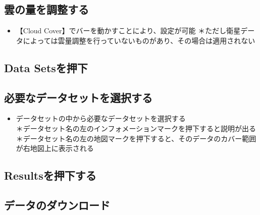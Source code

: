 \documentclass[
]{book}
\providecommand{\tightlist}{%
  \setlength{\itemsep}{0pt}\setlength{\parskip}{0pt}}
\begin{document}
\hypertarget{ux96f2ux306eux91cfux3092ux8abfux6574ux3059ux308b}{%
\subsection{雲の量を調整する}\label{ux96f2ux306eux91cfux3092ux8abfux6574ux3059ux308b}}

\begin{itemize}
\tightlist
\item
  【Cloud Cover】でバーを動かすことにより、設定が可能
  ＊ただし衛星データによっては雲量調整を行っていないものがあり、その場合は適用されない
\end{itemize}

\hypertarget{data-setsux3092ux62bcux4e0b}{%
\subsection{Data Setsを押下}\label{data-setsux3092ux62bcux4e0b}}

\hypertarget{ux5fc5ux8981ux306aux30c7ux30fcux30bfux30bbux30c3ux30c8ux3092ux9078ux629eux3059ux308b}{%
\subsection{必要なデータセットを選択する}\label{ux5fc5ux8981ux306aux30c7ux30fcux30bfux30bbux30c3ux30c8ux3092ux9078ux629eux3059ux308b}}

\begin{itemize}
\tightlist
\item
  データセットの中から必要なデータセットを選択する\\
  ＊データセット名の左のインフォメーションマークを押下すると説明が出る\\
  ＊データセット名の左の地図マークを押下すると、そのデータのカバー範囲が右地図上に表示される
\end{itemize}

\hypertarget{resultsux3092ux62bcux4e0bux3059ux308b}{%
\subsection{Resultsを押下する}\label{resultsux3092ux62bcux4e0bux3059ux308b}}

\hypertarget{ux30c7ux30fcux30bfux306eux30c0ux30a6ux30f3ux30edux30fcux30c9}{%
\subsection{データのダウンロード}\label{ux30c7ux30fcux30bfux306eux30c0ux30a6ux30f3ux30edux30fcux30c9}}
\end{document}
